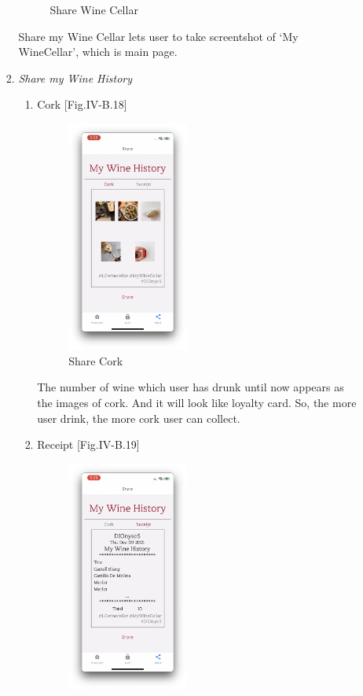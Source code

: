 \documentclass[conference]{IEEEtran}
\numberwithin{figure}{subsection}
\begin{document}
\begin{enumerate}
\begin{enumerate}
\begin{enumerate}
\begin{figure}[htb!]
                \caption{Share Wine Cellar}
            \end{figure}
            Share my Wine Cellar lets user to take screentshot of ‘My WineCellar’, which is main page.
            \item \textit{Share my Wine History}
            \begin{enumerate}
                \item Cork [Fig.IV-B.18]\\
                \begin{figure}[htb!]
                    \centerline{\includegraphics[width=4cm]{sharecork.png}}
                    \caption{Share Cork}
                \end{figure}
                The number of wine which user has drunk until now appears as the images of cork. And it will look like loyalty card. So, the more user drink, the more cork user can collect.
                \item Receipt [Fig.IV-B.19]\\
                \begin{figure}[htb!]
                    \centerline{\includegraphics[width=4cm]{sharerec.png}}

\end{figure}
\end{enumerate}
\end{enumerate}
\end{enumerate}
\end{enumerate}
\end{document}
